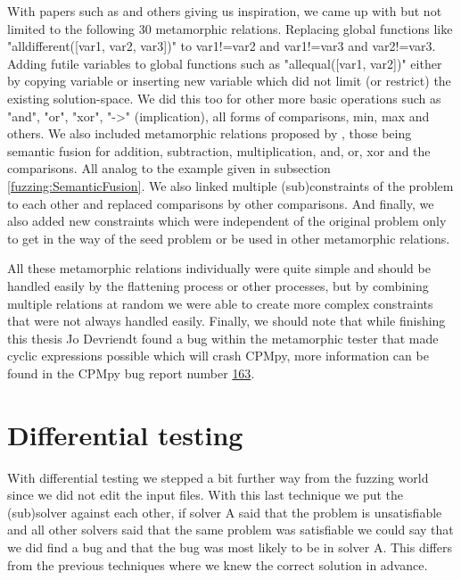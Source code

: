 With papers such as \cite{50akgun2018metamorphic, 49usman2020testmc, 43YinYang} and others giving us inspiration, we came up with but not limited to the following 30 metamorphic relations. Replacing global functions like "alldifferent([var1, var2, var3])" to var1!=var2 and var1!=var3 and var2!=var3. Adding futile variables to global functions such as "allequal([var1, var2])" either by copying variable or inserting new variable which did not limit (or restrict) the existing solution-space. We did this too for other more basic operations such as "and", "or", "xor", "->" (implication), all forms of comparisons, min, max and others. We also included metamorphic relations proposed by \cite{43YinYang}, those being semantic fusion for addition, subtraction, multiplication, and, or, xor and the comparisons. All analog to the example given in subsection \ref{fuzzing:SemanticFusion}. We also linked multiple (sub)constraints of the problem to each other and replaced comparisons by other comparisons. And finally, we also added new constraints which were independent of the original problem only to get in the way of the seed problem or be used in other metamorphic relations.

All these metamorphic relations individually were quite simple and should be handled easily by the flattening process or other processes, but by combining multiple relations at random we were able to create more complex constraints that were not always handled easily. Finally, we should note that while finishing this thesis Jo Devriendt found a bug within the metamorphic tester that made cyclic expressions possible which will crash CPMpy, more information can be found in the CPMpy bug report number \href{https://github.com/CPMpy/cpmpy/issues/163}{163}.

\section{Differential testing}
\label{impl:diff}
With differential testing we stepped a bit further way from the fuzzing world since we did not edit the input files.
With this last technique we put the (sub)solver against each other, if solver A said that the problem is unsatisfiable and all other solvers said that the same problem was satisfiable we could say that we did find a bug and that the bug was most likely to be in solver A. This differs from the previous techniques where we knew the correct solution in advance.


